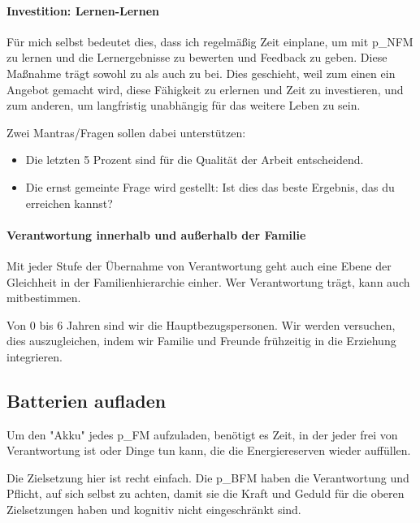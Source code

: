 \paragraph{Investition: Lernen-Lernen}

Für mich selbst bedeutet dies, dass ich regelmäßig Zeit einplane, um mit \gls{p_NFM} zu lernen und die Lernergebnisse zu bewerten und Feedback zu geben. Diese Maßnahme trägt sowohl zu \NFMOOne als auch zu \NFMOThree bei. Dies geschieht, weil zum einen ein Angebot gemacht wird, diese Fähigkeit zu erlernen und Zeit zu investieren, und zum anderen, um langfristig unabhängig für das weitere Leben zu sein.

Zwei Mantras/Fragen sollen dabei unterstützen:
\begin{itemize}
	\item Die letzten 5 Prozent sind für die Qualität der Arbeit entscheidend.
	\item Die ernst gemeinte Frage wird gestellt: Ist dies das beste Ergebnis, das du erreichen kannst?
\end{itemize}

\paragraph{Verantwortung innerhalb und außerhalb der Familie}

Mit jeder Stufe der Übernahme von Verantwortung geht auch eine Ebene der Gleichheit in der Familienhierarchie einher. Wer Verantwortung trägt, kann auch mitbestimmen.

Von 0 bis 6 Jahren sind wir die Hauptbezugspersonen. Wir werden versuchen, dies auszugleichen, indem wir Familie und Freunde frühzeitig in die Erziehung integrieren.

\subsection{Batterien aufladen}

Um den "Akku" jedes \gls{p_FM} aufzuladen, benötigt es Zeit, in der jeder frei von Verantwortung ist oder Dinge tun kann, die die Energiereserven wieder auffüllen.

Die Zielsetzung hier ist recht einfach. Die \gls{p_BFM} haben die Verantwortung und Pflicht, auf sich selbst zu achten, damit sie die Kraft und Geduld für die oberen Zielsetzungen haben und kognitiv nicht eingeschränkt sind.


